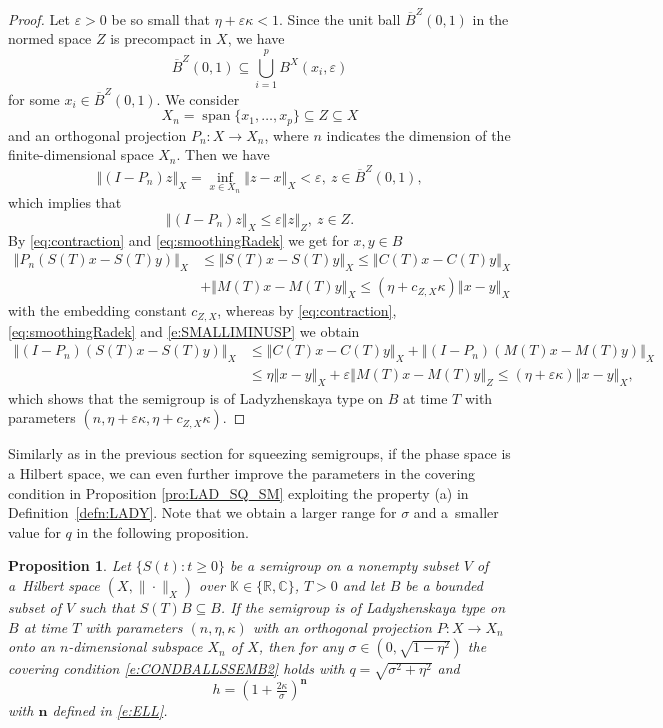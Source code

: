 \documentclass[a4paper,12pt,reqno]{amsart}
\theoremstyle{plain}
\newtheorem{prop}[lem]{Proposition}
\theoremstyle{definition}
\numberwithin{equation}{section}
\newcommand{\R}{\mathbb{R}}
\newcommand{\C}{\mathbb{C}}
\newcommand{\K}{\mathbb{K}}
\newcommand{\norm}[1]{\left\Vert#1\right\Vert}
\newcommand{\eps}{\varepsilon}
\newcommand{\lin}{\operatorname{span}}
\renewcommand{\geq}{\geqslant}
\renewcommand{\leq}{\leqslant}
\begin{document}
\begin{proof}
Let $\eps>0$ be so small that $\eta+\eps\kappa<1$. Since the unit ball $\overline{B}^{Z}(0,1)$ in the normed space $Z$ is precompact in $X$, we have
$$\overline{B}^{Z}(0,1)\subseteq\bigcup_{i=1}^{p}B^{X}(x_i,\eps)$$
for some $x_i\in\overline{B}^{Z}(0,1)$. We consider
$$X_n=\lin\{x_1,\ldots,x_p\}\subseteq Z\subseteq X$$
and an orthogonal projection $P_n\colon X\to X_n$, where $n$ indicates the dimension of the finite-dimensional space $X_n$. Then we have
$$\norm{(I-P_n)z}_{X}=\inf_{x\in X_n}\norm{z-x}_{X}<\eps,\ z\in \overline{B}^{Z}(0,1),$$
which implies that
\begin{equation}\label{e:SMALLIMINUSP}
\norm{(I-P_n)z}_{X}\leq\eps\norm{z}_{Z},\ z\in Z.
\end{equation} 
By \eqref{eq:contraction} and \eqref{eq:smoothingRadek} we get for $x,y\in B$
\begin{equation*}
\begin{split}
\norm{P_n(S(T)x-S(T)y)}_{X}&\leq\norm{S(T)x-S(T)y}_{X}\leq\norm{C(T)x-C(T)y}_{X}\\
&+\norm{M(T)x-M(T)y}_{X}\leq(\eta+c_{Z,X}\kappa)\norm{x-y}_{X}
\end{split}
\end{equation*}
with the embedding constant $c_{Z,X}$, whereas by \eqref{eq:contraction}, \eqref{eq:smoothingRadek} and \eqref{e:SMALLIMINUSP} we obtain
\begin{equation*}
\begin{split}
\norm{(I-P_n)(S(T)x-S(T)y)}_{X}&\leq\norm{C(T)x-C(T)y}_{X}+\norm{(I-P_n)(M(T)x-M(T)y)}_{X}\\
&\leq\eta\norm{x-y}_{X}+\eps\norm{M(T)x-M(T)y}_{Z}\leq(\eta+\eps\kappa)\norm{x-y}_{X},
\end{split}
\end{equation*} 
which shows that the semigroup is of Ladyzhenskaya type on $B$ at time $T$ with parameters $(n,\eta+\eps\kappa,\eta+c_{Z,X}\kappa)$.
\end{proof}

Similarly as in the previous section for squeezing semigroups, if the phase space is a Hilbert space, we can even further improve the parameters in the covering condition in Proposition \ref{pro:LAD_SQ_SM} exploiting the property (a) in Definition~\ref{defn:LADY}. Note that we obtain a larger range for $\sigma$  and a~smaller value for $q$ in the following proposition. 

\begin{prop}\label{prop:LAD}
Let $\{S(t)\colon t\geq 0\}$ be a semigroup on a nonempty subset $V$ of a~Hilbert space $(X,\|\cdot\|_{X})$ over $\K\in\{\R,\C\}$, $T>0$ 
and let $B$ be a bounded subset of $V$ such that $S(T)B\subseteq B$.
If the semigroup is of Ladyzhenskaya type on $B$ at time $T$ with parameters $(n,\eta,\kappa)$ with an orthogonal projection $P\colon X\to X_n$ onto an $n$-dimensional subspace $X_n$ of $X$, then for any $\sigma \in (0,\sqrt{1-\eta^2})$
the covering condition \eqref{e:CONDBALLSSEMB2} holds with
$q=\sqrt{\sigma^2+\eta^2}$ and 
$$h=\left(1+\tfrac{2\kappa}{\sigma}\right)^{\mathbf{n}}$$
with $\mathbf{n}$ defined in \eqref{e:ELL}.
\end{prop}
\end{document}
